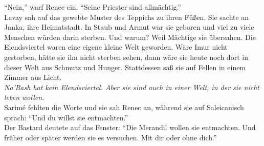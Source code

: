 ``Nein,'' warf Renec ein: ``Seine Priester sind allmächtig.''\\
Lavay sah auf das gewebte Muster des Teppichs zu ihren Füßen. Sie sachte an Janka, ihre 
Heimatstadt. In Staub und Armut war sie geboren und viel zu viele Menschen würden darin sterben. 
Und warum? Weil Mächtige sie übersahen. Die Elendsviertel waren eine eigene kleine Welt geworden. 
Wäre Imur nicht gestorben, hätte sie ihn nicht sterben sehen, dann wäre sie heute noch dort in 
dieser Welt aus Schmutz und Hunger. Stattdessen saß sie auf Fellen in einem Zimmer aus Licht.\\
\textit{Na'Rash hat kein Elendsviertel. Aber sie sind auch in einer Welt, in der sie nicht leben 
wollen.}\\
Sarimé fehlten die Worte und sie sah Renec an, während sie auf Saleicanisch sprach: ``Und du willst 
sie entmachten.''\\
Der Bastard deutete auf das Fenster: ``Die Merandil wollen sie entmachten. Und früher oder später 
werden sie es versuchen. Mit dir oder ohne dich.''\\


